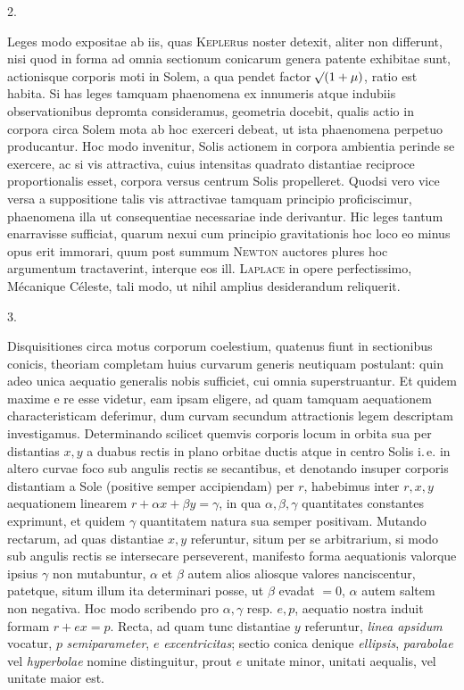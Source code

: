 \clearpage
{}
\begin{center}
2.
\end{center}
Leges modo expositae ab iis, quas \textsc{Kepler}us noster detexit, aliter non differunt, nisi quod in forma ad omnia sectionum conicarum genera patente exhibitae sunt, actionisque corporis moti in Solem, a qua pendet factor $\mathord{{}^{}\!\surd}(1+\mu)$, ratio est habita. Si has leges tamquam phaenomena ex innumeris atque indubiis observationibus depromta consideramus, geometria docebit, qualis actio
in corpora circa Solem mota ab hoc exerceri debeat, ut ista phaenomena perpetuo producantur. Hoc modo invenitur, Solis actionem in corpora ambientia perinde se exercere, ac si vis attractiva, cuius intensitas quadrato distantiae reciproce proportionalis esset, corpora versus centrum Solis propelleret. Quodsi vero vice versa a suppositione talis vis attractivae tamquam principio proficiscimur, phaenomena illa ut consequentiae necessariae inde derivantur. Hic leges tantum enarravisse sufficiat, quarum nexui cum principio gravitationis hoc loco eo minus opus erit immorari, quum post summum \textsc{Newton} auctores plures hoc argumentum tractaverint, interque eos ill. \textsc{Laplace} in opere perfectissimo, Mécanique Céleste, tali modo, ut nihil amplius desiderandum reliquerit.

\begin{center}
3.
\end{center}

Disquisitiones circa motus corporum coelestium, quatenus fiunt in sectionibus conicis, theoriam completam huius curvarum generis neutiquam postulant: quin adeo unica aequatio generalis nobis sufficiet, cui omnia superstruantur. Et quidem maxime e re esse videtur, eam ipsam eligere, ad quam tamquam aequationem characteristicam deferimur, dum curvam secundum attractionis legem descriptam investigamus. Determinando scilicet quemvis corporis locum in orbita sua per distantias $x, y$ a duabus rectis in plano orbitae ductis atque in centro Solis i.\,e. in altero curvae foco sub angulis rectis se secantibus, et denotando insuper corporis distantiam a Sole (positive semper accipiendam) per $r$, habebimus inter $r, x, y$ aequationem linearem $r+\alpha x+\beta y=\gamma$, in qua $\alpha, \beta, \gamma$ quantitates constantes exprimunt, et quidem $\gamma$ quantitatem natura sua semper positivam. Mutando rectarum, ad quas distantiae $x, y$ referuntur, situm per se arbitrarium, si modo sub angulis rectis se intersecare perseverent, manifesto forma aequationis valorque ipsius $\gamma$ non mutabuntur, $\alpha$ et $\beta$ autem alios aliosque valores nanciscentur, patetque, situm illum ita determinari posse, ut $\beta$ evadat $=0$, $\alpha$ autem saltem non negativa. Hoc modo scribendo pro $\alpha, \gamma$ resp. $e, p$, aequatio nostra induit formam $r+ex=p$. Recta, ad quam tunc distantiae $y$ referuntur, \emph{linea apsidum} vocatur, $p$ \emph{semiparameter}, $e$ \emph{excentricitas}; sectio conica denique \emph{ellipsis}, \emph{parabolae} vel \emph{hyperbolae} nomine distinguitur, prout $e$ unitate minor, unitati aequalis, vel unitate maior est.

